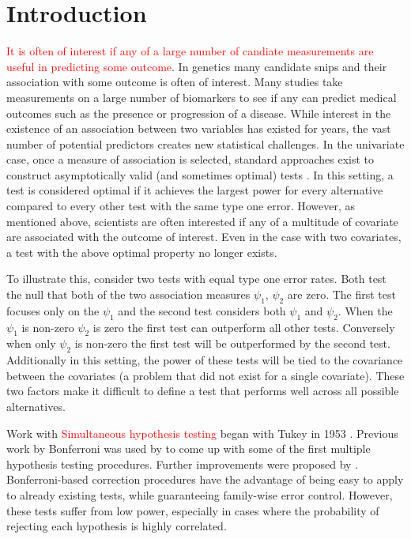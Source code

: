 \documentclass{article}
\author{Adam Elder}
\newcommand{\sh}{\textcolor{red}}
\begin{document}
\section{Introduction}

\sh{It is often of interest if any of a large number of candiate measurements are useful in predicting some outcome}. In genetics many candidate snips and their association with some outcome is often of interest. Many studies take measurements on a large number of biomarkers to see if any can predict medical outcomes such as the presence  or progression of a disease. While interest in the existence of an association between two variables has existed for years, the vast number of potential predictors creates new statistical challenges.  In the univariate case, once a measure of association is selected, standard approaches exist to construct asymptotically valid (and sometimes optimal) tests \citep{neyman_jerzy_ix._1933}. In this setting, a test is considered optimal if it achieves the largest power for every alternative compared to every other test with the same type one error.  However, as mentioned above, scientists are often interested if any of a multitude of covariate are associated with the outcome of interest.  Even in the case with two covariates, a test with the above optimal property no longer exists.

To illustrate this, consider two tests with equal type one error rates. Both test the null that both of the two association measures $\psi_1$, $\psi_2$ are zero. The first test focuses only on the $\psi_1$ and the second test considers both $\psi_1$ and $\psi_2$.  When the $\psi_1$ is non-zero $\psi_2$ is zero the first test can outperform all other tests.  Conversely when only $\psi_2$ is non-zero the first test will be outperformed by the second test.  Additionally in this setting, the power of these tests will be tied to the covariance between the covariates (a problem that did not exist for a single covariate).  These two factors make it difficult to define a test that performs well across all possible alternatives.  

Work with \textcolor{red}{Simultaneous hypothesis testing}
began with Tukey in 1953 \citep{miller_simultaneous_1981}.  Previous work by Bonferroni was used by \citep{dunn_estimation_1959,dunn_multiple_1961} to come up with some of the first multiple hypothesis testing procedures.  Further improvements were proposed by \citep{hochberg_sharper_1988,holm_simple_1979,s._holland_improved_1988}.  Bonferroni-based correction procedures have the advantage of being easy to apply to already existing tests, while guaranteeing family-wise error control. However, these tests suffer from low power, especially in cases where the probability of rejecting each hypothesis is highly correlated. 
\end{document}

